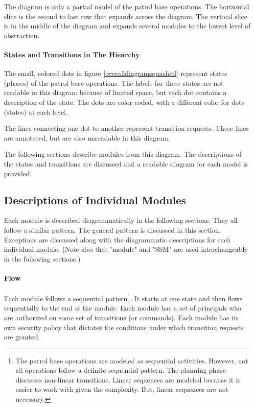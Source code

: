 \documentclass[../../main/main.tex]{subfiles}
\begin{document}
The diagram is only a partial model of the patrol base operations.  The horizontal slice is the second to last row that expands across the diagram.  The vertical slice is in the middle of the diagram and expands several modules to the lowest level of abstraction.  

\paragraph*{States and Transitions in The Hiearchy}
The small, colored dots in figure \ref{overalldiagramsquashed} represent states (phases) of the patrol base operations.   The labels for these states are not readable in this diagram because of limited space, but each dot contains a description of the state.  The dots are color coded, with a different color for dots (states) at each level. 

The lines connecting one dot to another represent transition requests.  These lines are annotated, but are also unreadable in this diagram. 

The following sections describe modules from this diagram.  The descriptions of the states and transitions are discussed and a readable diagram for each model is provided.  


\subsection{Descriptions of Individual Modules}
Each module is described diagrammatically in the following sections.  They all follow a similar pattern.  The general pattern is discussed in this section.  Exceptions are discussed along with the diagrammatic descriptions for each individual module. (Note also that "module" and "SSM" are used interchangeably in the following sections.)

\paragraph*{Flow}
Each module follows a sequential pattern\footnote{The patrol base operations are modeled as sequential activities.  However, not all operations follow a definite sequential pattern.  The planning phase discusses non-linear transitions.  Linear sequences are modeled because it is easier to work with given the complexity.  But, linear sequences are not necessary.}.  It starts at one state and then flows sequentially to the end of the module. Each module has a set of principals who are authorized on some set of transitions (or commands).  Each module has its own security policy that dictates the conditions under which transition requests are granted.  
\end{document}
